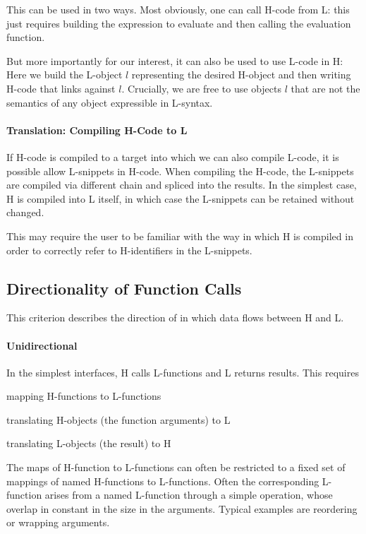 This can be used in two ways.
Most obviously, one can call H-code from L:
this just requires building the expression to evaluate and then calling the evaluation function.

But more importantly for our interest, it can also be used to use L-code in H:
Here we build the L-object $l$ representing the desired H-object and then writing H-code that links against $l$.
Crucially, we are free to use objects $l$ that are not the semantics of any object expressible in L-syntax.

\paragraph{Translation: Compiling H-Code to L}
If H-code is compiled to a target into which we can also compile L-code, it is possible allow L-snippets in H-code.
When compiling the H-code, the L-snippets are compiled via different chain and spliced into the results.
In the simplest case, H is compiled into L itself, in which case the L-snippets can be retained without changed.

This may require the user to be familiar with the way in which H is compiled in order to correctly refer to H-identifiers in the L-snippets.

\subsection{Directionality of Function Calls}

This criterion describes the direction of in which data flows between H and L.

\paragraph{Unidirectional}
In the simplest interfaces, H calls L-functions and L returns results.
This requires
\begin{compactitem}
 \item mapping H-functions to L-functions
 \item translating H-objects (the function arguments) to L
 \item translating L-objects (the result) to H
\end{compactitem}

The maps of H-function to L-functions can often be restricted to a fixed set of mappings of named H-functions to L-functions.
Often the corresponding L-function arises from a named L-function through a simple operation, whose overlap in constant in the size in the arguments.
Typical examples are reordering or wrapping arguments.

